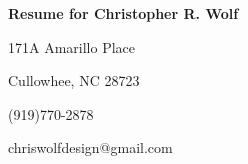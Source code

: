 \documentclass[12pt]{letter}
\begin{document}
    \centerline{\textbf{Resume for Christopher R. Wolf}}
    \centerline{171A Amarillo Place}
    \centerline{Cullowhee, NC 28723}
    \centerline{(919)770-2878}
    \centerline{chriswolfdesign@gmail.com}
\end{document}
